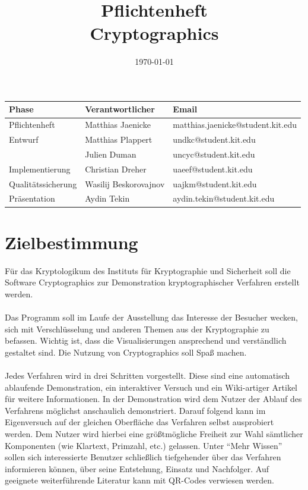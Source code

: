 \documentclass{article}
\title{\textbf{Pflichtenheft} \\ Cryptographics}
\author{}
\date{\today}
\begin{document}
\maketitle
\begin{table}[b]
  \begin{tabular}{| l | l | l |}
    \hline
    \textbf{Phase} & \textbf{Verantwortlicher} & \textbf{Email} \\ \hline
    Pflichtenheft & Matthias Jaenicke & matthias.jaenicke@student.kit.edu \\ \hline
    Entwurf & Matthias Plappert & undkc@student.kit.edu \\
            & Julien Duman & uncyc@student.kit.edu \\ \hline
    Implementierung & Christian Dreher & uaeef@student.kit.edu \\ \hline
    Qualitätssicherung & Wasilij Beskorovajnov & uajkm@student.kit.edu \\ \hline
    Präsentation & Aydin Tekin & aydin.tekin@student.kit.edu \\ \hline
    \end{tabular}
\end{table}
\newpage


\tableofcontents
\newpage

\section{Zielbestimmung}

Für das \gls{Kryptologikum} des Instituts für
Kryptographie und Sicherheit soll die Software \gls{Cryptographics} zur
Demonstration kryptographischer Verfahren erstellt werden. \\
\\
Das Programm soll im Laufe der Ausstellung das Interesse der Besucher wecken, sich mit Verschlüsselung und anderen Themen aus der Kryptographie zu befassen. Wichtig ist, dass die Visualisierungen ansprechend und verständlich gestaltet sind. Die Nutzung von \gls{Cryptographics} soll Spaß machen. \\
\\
Jedes Verfahren wird in drei Schritten vorgestellt. Diese sind eine automatisch ablaufende Demonstration, ein interaktiver Versuch und ein Wiki-artiger Artikel für weitere Informationen.
In der Demonstration wird dem Nutzer der Ablauf des Verfahrens möglichst anschaulich demonstriert. Darauf folgend kann im Eigenversuch auf der gleichen Oberfläche das Verfahren selbst ausprobiert werden. Dem Nutzer wird hierbei eine größtmögliche Freiheit zur Wahl sämtlicher Komponenten (wie Klartext, Primzahl, etc.) gelassen. Unter ``Mehr Wissen'' sollen sich interessierte Benutzer schließlich tiefgehender über das Verfahren informieren können, über seine Entstehung, Einsatz und Nachfolger. Auf geeignete weiterführende Literatur kann mit QR-Codes verwiesen werden. \\
\end{document}
